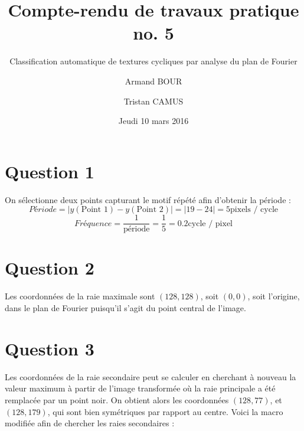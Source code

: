 \documentclass[french,]{article}
\title{Compte-rendu de travaux pratique no. 5}
\subtitle{Classification automatique de textures cycliques par analyse du plan de
Fourier}
\author{
Armand BOUR
 \and
Tristan CAMUS
}
\date{Jeudi 10 mars 2016}
\begin{document}
\maketitle

\section{Question 1}\label{question-1}

On sélectionne deux points capturant le motif répété afin d'obtenir la
période :
\[Période= |y(\text{Point 1}) - y(\text{Point 2})| = |19 - 24| = 5 \text{pixels / cycle}\]
\[Fréquence = \frac{1}{\text{période}} = \frac{1}{5} = 0.2 \text{cycle / pixel}\]

\section{Question 2}\label{question-2}

Les coordonnées de la raie maximale sont \((128, 128)\), soit
\((0, 0)\), soit l'origine, dans le plan de Fourier puisqu'il s'agit du
point central de l'image.

\section{Question 3}\label{question-3}

Les coordonnées de la raie secondaire peut se calculer en cherchant à
nouveau la valeur maximum à partir de l'image transformée où la raie
principale a été remplacée par un point noir. On obtient alors les
coordonnées \((128, 77)\), et \((128, 179)\), qui sont bien symétriques
par rapport au centre. Voici la macro modifiée afin de chercher les
raies secondaires :
\end{document}
